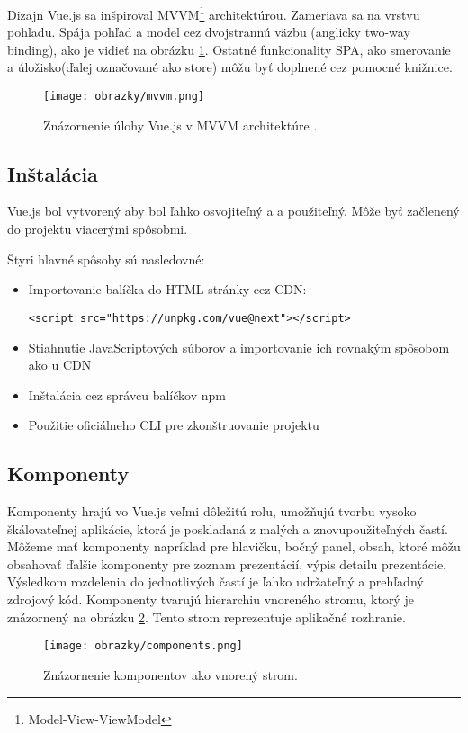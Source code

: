 Dizajn Vue.js sa inšpiroval MVVM\footnote{Model-View-ViewModel} architektúrou. Zameriava sa na vrstvu pohľadu. Spája pohľad a model cez dvojstrannú väzbu (anglicky two-way binding), ako je vidieť na obrázku \ref{pic:mvvm}. Ostatné funkcionality SPA, ako smerovanie a úložisko(ďalej označované ako store) môžu byť doplnené cez pomocné knižnice.
    \begin{figure}[!hbt]
        \centering
        \texttt{[image: obrazky/mvvm.png]}
        \caption{Znázornenie úlohy Vue.js v MVVM architektúre \cite{vue-guide}.}
        \label{pic:mvvm}
    \end{figure}

\subsection*{Inštalácia}
Vue.js bol vytvorený aby bol ľahko osvojiteľný a a použiteľný. Môže byť začlenený do projektu viacerými spôsobmi. 

Štyri hlavné spôsoby sú nasledovné:
    \begin{itemize}
        \item Importovanie balíčka do HTML stránky cez CDN:
        \begin{verbatim}<script src="https://unpkg.com/vue@next"></script>\end{verbatim}
        \item Stiahnutie JavaScriptových súborov a importovanie ich rovnakým spôsobom ako u CDN
        \item Inštalácia cez správcu balíčkov npm
        \item Použitie oficiálneho CLI pre zkonštruovanie projektu
    \end{itemize}
    
\subsection*{Komponenty}
Komponenty hrajú vo Vue.js veľmi dôležitú rolu, umožňujú tvorbu vysoko škálovateľnej aplikácie, ktorá je poskladaná z malých a znovupoužiteľných častí. Môžeme mať komponenty napríklad pre hlavičku, bočný panel, obsah, ktoré môžu obsahovať ďalšie komponenty pre zoznam prezentácií, výpis detailu prezentácie. Výsledkom rozdelenia do jednotlivých častí je ľahko udržateľný a prehľadný zdrojový kód. Komponenty tvarujú hierarchiu vnoreného stromu, ktorý je znázornený na obrázku \ref{pic:components}. Tento strom reprezentuje aplikačné rozhranie.
    \begin{figure}[!hbt]
        \centering
        \texttt{[image: obrazky/components.png]}
        \caption{Znázornenie komponentov ako vnorený strom\cite{vue-guide}.}
        \label{pic:components}
    \end{figure}
    
